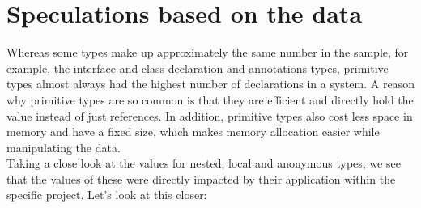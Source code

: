 \documentclass{assignment}
\begin{document}
\section*{Speculations based on the data}

	Whereas some types make up approximately the same number in the sample, for example, the interface and class declaration and annotations types, primitive types almost always had the highest number of declarations in a system. A reason why primitive types are so common is that they are efficient and directly hold the value instead of just references. In addition, primitive types also cost less space in memory and have a fixed size, which makes memory allocation easier while manipulating the data.\\

	Taking a close look at the values for nested, local and anonymous types, we see that the values of these were directly impacted by their application within the specific project. 
Let’s look at this closer:
\end{document}
